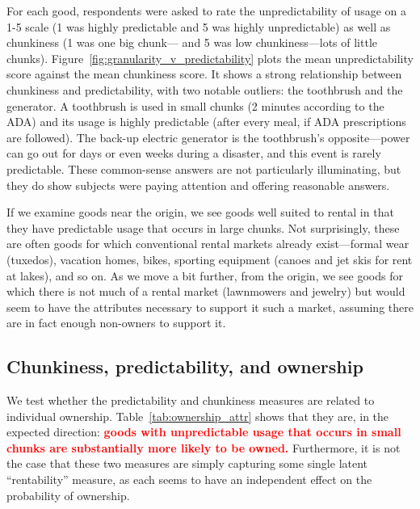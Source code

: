 \documentclass[11pt]{article}
\newcommand{\important}[1]{\textcolor{red}{\textbf{#1}}}
\newcommand{\important}[1]{#1}
\begin{document}
For each good, respondents were asked to rate the unpredictability of usage on a 1-5 scale (1 was highly predictable and 5 was highly unpredictable) as well as chunkiness (1 was one big chunk--- and 5 was low chunkiness---lots of little chunks).  
Figure~\ref{fig:granularity_v_predictability} plots the mean unpredictability score against the mean chunkiness score. 
It shows a strong relationship between chunkiness and predictability, with two notable outliers: the toothbrush and the generator. 
A toothbrush is used in small chunks (2 minutes according to the ADA) and its usage is highly predictable (after every meal, if ADA prescriptions are followed).
The back-up electric generator is the toothbrush's opposite---power can go out for days or even weeks during a disaster, and this event is rarely predictable. 
These common-sense answers are not particularly illuminating, but they do show subjects were paying attention and offering reasonable answers. 

If we examine goods near the origin, we see goods well suited to rental in that they have predictable usage that occurs in large chunks. 
Not surprisingly, these are often goods for which conventional rental markets already exist---formal wear (tuxedos), vacation homes, bikes, sporting equipment (canoes and jet skis for rent at lakes), and so on.
As we move a bit further, from the origin, we see goods for which there is not much of a rental market (lawnmowers and jewelry) but would seem to have the attributes necessary to support it such a market, assuming there are in fact enough non-owners to support it.  

\subsection{Chunkiness, predictability, and ownership} 

We test whether the predictability and chunkiness measures are related to individual ownership. 
Table~\ref{tab:ownership_attr} shows that they are, in the expected direction:
\important{goods with unpredictable usage that occurs in small chunks are substantially more likely to be owned.}
Furthermore, it is not the case that these two measures are simply capturing some single latent ``rentability'' measure, as each seems to have an independent effect on the probability of ownership. 

 
\end{document}
